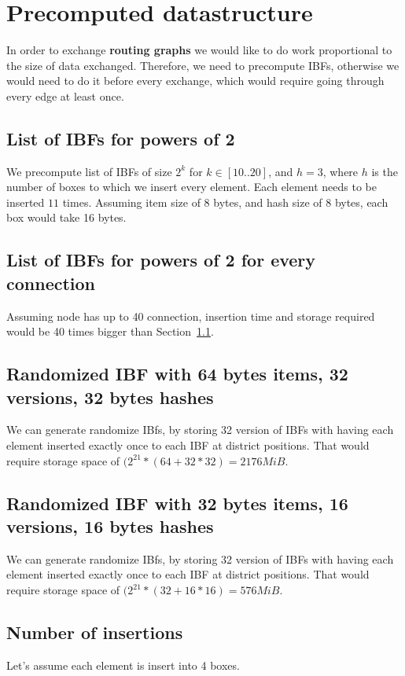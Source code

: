 \documentclass[11pt]{article}
\begin{document}
\section{Precomputed datastructure}
In order to exchange \textbf{routing graphs} we would like to do work proportional to the size of data exchanged.
Therefore, we need to precompute IBFs, otherwise we would need to do it before every exchange, which would require going through every edge at least once.
\subsection{List of IBFs for powers of 2}  \label{first_precomputed}
We precompute list of IBFs of size $2^k$ for $k \in [10..20]$, and $h = 3$, where $h$ is the number of boxes to which we insert every element.
Each element needs to be inserted $11$ times. Assuming item size of $8$ bytes, and hash size of $8$ bytes, each box would take 16 bytes.


\subsection{List of IBFs for powers of 2 for every connection}
Assuming node has up to 40 connection, insertion time and storage required would be 40 times bigger than Section~\ref{first_precomputed}.

\subsection{Randomized IBF with 64 bytes items, 32 versions, 32 bytes hashes}
We can generate randomize IBfs, by storing 32 version of IBFs with having each element inserted exactly once to each IBF at district positions.
That would require storage space of $(2^{21} * (64 + 32 * 32) = 2176 MiB$.

\subsection{Randomized IBF with 32 bytes items, 16 versions, 16 bytes hashes}
We can generate randomize IBfs, by storing 32 version of IBFs with having each element inserted exactly once to each IBF at district positions.
That would require storage space of $(2^{21} * (32 +16 * 16) = 576 MiB$.


\subsection{Number of insertions}
Let's assume each element is insert into 4 boxes.
\end{document}
